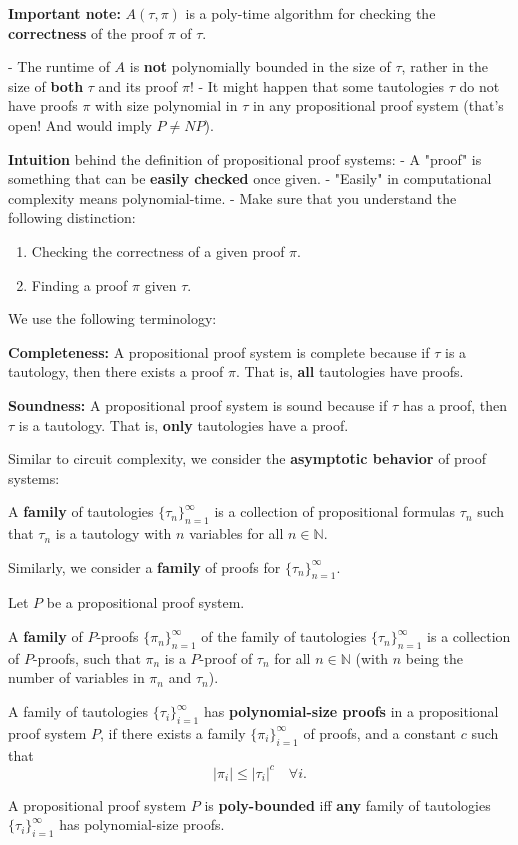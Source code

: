 \textbf{Important note:} $A(\tau, \pi)$ is a poly-time algorithm for checking the \textbf{correctness} of the proof $\pi$ of $\tau$.

- The runtime of $A$ is \textbf{not} polynomially bounded in the size of $\tau$, rather in the size of \textbf{both} $\tau$ and its proof $\pi$!
- It might happen that some tautologies $\tau$ do not have proofs $\pi$ with size polynomial in $\tau$ in any propositional proof system (that’s open! And would imply $P \neq NP$).

\textbf{Intuition} behind the definition of propositional proof systems:
- A "proof" is something that can be \textbf{easily checked} once given.
- "Easily" in computational complexity means polynomial-time.
- Make sure that you understand the following distinction:
  \begin{enumerate}
      \item Checking the correctness of a given proof $\pi$.
      \item Finding a proof $\pi$ given $\tau$.
  \end{enumerate}


We use the following terminology:

\textbf{Completeness:} A propositional proof system is complete because if $\tau$ is a tautology, then there exists a proof $\pi$.  
That is, \textbf{all} tautologies have proofs.

\textbf{Soundness:} A propositional proof system is sound because if $\tau$ has a proof, then $\tau$ is a tautology.  
That is, \textbf{only} tautologies have a proof.

Similar to circuit complexity, we consider the \textbf{asymptotic behavior} of proof systems:

A \textbf{family} of tautologies $\{\tau_n\}_{n=1}^{\infty}$ is a collection of propositional formulas $\tau_n$ such that $\tau_n$ is a tautology with $n$ variables for all $n \in \mathbb{N}$.

Similarly, we consider a \textbf{family} of proofs for $\{\tau_n\}_{n=1}^{\infty}$.

Let $P$ be a propositional proof system.

A \textbf{family} of $P$-proofs $\{\pi_n\}_{n=1}^{\infty}$ of the family of tautologies $\{\tau_n\}_{n=1}^{\infty}$ is a collection of $P$-proofs, such that $\pi_n$ is a $P$-proof of $\tau_n$ for all $n \in \mathbb{N}$ (with $n$ being the number of variables in $\pi_n$ and $\tau_n$).

\begin{definition}
A family of tautologies $\{\tau_i\}_{i=1}^{\infty}$ has \textbf{polynomial-size proofs} in a propositional proof system $P$, if there exists a family $\{\pi_i\}_{i=1}^{\infty}$ of proofs, and a constant $c$ such that  
\[
|\pi_i| \leq |\tau_i|^c \quad \forall i.
\]

A propositional proof system $P$ is \textbf{poly-bounded} iff \textbf{any} family of tautologies $\{\tau_i\}_{i=1}^{\infty}$ has polynomial-size proofs.
\end{definition}


